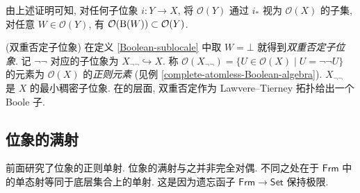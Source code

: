 由上述证明可知, 对任何子位象 $i\colon Y\to X$, 将 $\mathcal O(Y)$ 通过 $i_*$ 视为 $\mathcal O(X)$ 的子集,
对任意 $W\in\mathcal O(Y)$, 有 $\mathcal O(\text{B}(W)) \subset\mathcal O(Y)$.

\begin{example}
	[label={double-negation-sublocale}]
	{(双重否定子位象)}
	在定义 \ref{Boolean-sublocale} 中取 $W=\bot$ 就得到\emph{双重否定子位象}.
	记 $\neg\neg$ 对应的子位象为 $X_{\neg\neg}\hookrightarrow X$.
	称 $\mathcal O(X_{\neg\neg}) = \{U\in\mathcal O(X)\mid U = \neg\neg U\}$ 的元素为 $\mathcal O(X)$ 的\emph{正则元素} (见例 \ref{complete-atomless-Boolean-algebra}).
	$X_{\neg\neg}$ 是 $X$ 的最小稠密子位象.
	在\topos{}的层面, 双重否定作为 Lawvere--Tierney 拓扑给出一个 Boole 子\topos{}.
\end{example}

\subsection{位象的满射}

前面研究了位象的正则单射. 位象的满射与之并非完全对偶. 不同之处在于 $\mathsf {Frm}$ 中的单态射等同于底层集合上的单射. 这是因为遗忘函子 $\mathsf {Frm}\to\mathsf {Set}$ 保持极限.

